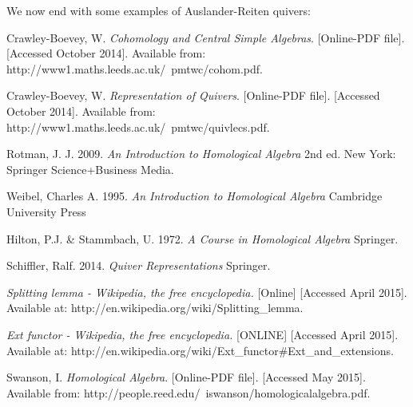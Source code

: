 \documentclass[11.5pt, twoside, a4paper, titlepage]{report}
\theoremstyle{definition}
\theoremstyle{plain}
\begin{document}
We now end with some examples of Auslander-Reiten quivers:



































\begin{thebibliography}{99}

Crawley-Boevey, W.
\emph{Cohomology and Central Simple Algebras}. [Online-PDF file]. [Accessed October 2014].
Available from: http://www1.maths.leeds.ac.uk/~pmtwc/cohom.pdf.

Crawley-Boevey, W.
\emph{Representation of Quivers}. [Online-PDF file]. [Accessed October 2014].
Available from: http://www1.maths.leeds.ac.uk/~pmtwc/quivlecs.pdf.

Rotman, J. J.
2009.
\emph{An Introduction to Homological Algebra}
2nd ed.
New York: Springer Science+Business Media.

Weibel, Charles A.
1995.
\emph{An Introduction to Homological Algebra}
Cambridge University Press

Hilton, P.J. \& Stammbach, U.
1972.
\emph{A Course in Homological Algebra}
Springer.

Schiffler, Ralf.
2014.
\emph{Quiver Representations}
Springer.

\emph{Splitting lemma - Wikipedia, the free encyclopedia.} [Online]  [Accessed April 2015].
Available at: http://en.wikipedia.org/wiki/Splitting\_lemma.

\emph{Ext functor - Wikipedia, the free encyclopedia.} [ONLINE]  [Accessed April 2015].
Available at: http://en.wikipedia.org/wiki/Ext\_functor\#Ext\_and\_extensions.

Swanson, I.
\emph{Homological Algebra}. [Online-PDF file]. [Accessed May 2015].
Available from: http://people.reed.edu/~iswanson/homologicalalgebra.pdf.


\end{thebibliography}
\end{document}
